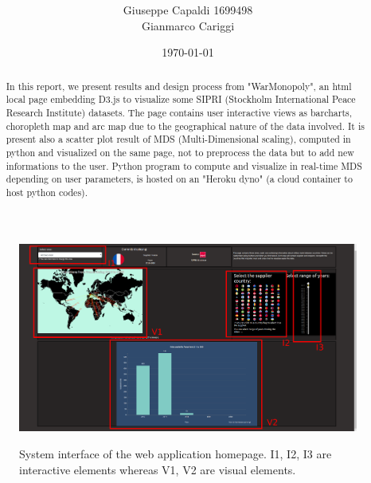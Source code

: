 \documentclass{article}
\title{\vspace{-2.0cm}\spacecaps{WarInspector: Visual Analytics web application on Arms Transfer}\\ \normalsize \spacesc{Visual Analytics Course Sapienza University of Rome} }
\author{Giuseppe Capaldi 1699498\\ Gianmarco Cariggi}
\date{\today}
\begin{document}
\maketitle




\begin{figure}[ht!]
\centering
\includegraphics[scale=0.25,center]{fig/va.png}
   \label{fig:va}
    \caption{System interface of the web application homepage. I1, I2, I3 are interactive elements whereas V1, V2 are visual elements. }

\end{figure}
    
    
\begin{abstract}
%
In this report, we present results and design process from "WarMonopoly", an html local page embedding D3.js to visualize some SIPRI (Stockholm International Peace Research Institute) datasets. The page contains user interactive views as barcharts, choropleth map and arc map due to the geographical nature of the data involved. It is present also a scatter plot result of MDS (Multi-Dimensional scaling), computed in python and visualized on the same page, not to preprocess the data but to add new informations to the user. Python program to compute and visualize in real-time MDS depending on user parameters, is hosted on an "Heroku dyno" (a cloud container to host python codes).


%
\end{abstract}
\end{document}
